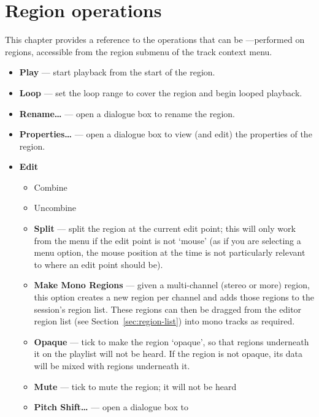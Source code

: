 \documentclass[10pt,a4paper]{book}
\begin{document}
{%

\chapter{Region operations}
\label{ch:region-operations}

This chapter provides a reference to the operations that can be
---performed on regions, accessible from the region submenu of the track
context menu.

\begin{itemize}
\item \textbf{Play} --- start playback from the start of the region.
\item \textbf{Loop} --- set the loop range to cover the region and begin looped playback.
\item \textbf{Rename\ldots} --- open a dialogue box to rename the region.
\item \textbf{Properties\ldots} --- open a dialogue box to view (and edit) the properties of the region.
\item \textbf{Edit}
\begin{itemize}
\item Combine
\item Uncombine
\item \textbf{Split} --- split the region at the current edit point;
  this will only work from the menu if the edit point is not `mouse'
  (as if you are selecting a menu option, the mouse position at the
  time is not particularly relevant to where an edit point should be).
\item \textbf{Make Mono Regions} --- given a multi-channel (stereo or
  more) region, this option creates a new region per channel and adds
  those regions to the session's region list.  These regions can then
  be dragged from the editor region list (see
  Section~\ref{sec:region-list}) into mono tracks as required.
\item \textbf{Opaque} --- tick to make the region `opaque', so that
  regions underneath it on the playlist will not be heard.  If the
  region is not opaque, its data will be mixed with regions underneath
  it.
\item \textbf{Mute} --- tick to mute the region; it will not be heard
\item \textbf{Pitch Shift\ldots} --- open a dialogue box to

\end{itemize}
\end{itemize}}
\end{document}
